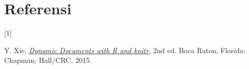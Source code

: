 \documentclass[
  letterpaper,
]{book}
\newlength{\cslhangindent}
\newlength{\csllabelwidth}
\newenvironment{CSLReferences}[2] %
 {\begin{list}{}{%
  \setlength{\itemindent}{0pt}
  \setlength{\leftmargin}{0pt}
  \setlength{\parsep}{0pt}
  \ifodd #1
   \setlength{\leftmargin}{\cslhangindent}
   \setlength{\itemindent}{-1\cslhangindent}
  \fi
  \setlength{\itemsep}{#2\baselineskip}}}
 {\end{list}}
\newcommand{\CSLLeftMargin}[1]{\parbox[t]{\csllabelwidth}{\strut#1\strut}}
\newcommand{\CSLRightInline}[1]{\parbox[t]{\linewidth - \csllabelwidth}{\strut#1\strut}}
\begin{document}

\chapter*{Referensi}\label{referensi}


\label{refs}
\begin{CSLReferences}{0}{0}
\CSLLeftMargin{{[}1{]} }%
\CSLRightInline{Y. Xie, \emph{\href{http://yihui.name/knitr/}{Dynamic
Documents with {R} and knitr}}, 2nd ed. Boca Raton, Florida: Chapman;
Hall/CRC, 2015.}

\end{CSLReferences}


\backmatter
\end{document}
